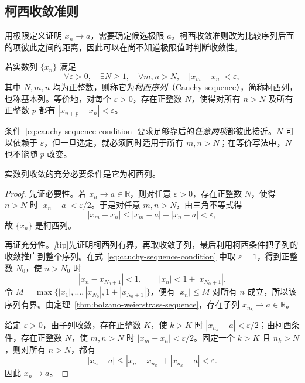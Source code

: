 \documentclass[UTF8,12pt,a4paper,fontset=fandol]{ctexbook}
\begin{document}
\subsection{柯西收敛准则}
\label{subsec:cauchy-convergence-criterion}

用极限定义证明 $x_n\to a$，需要确定候选极限 $a$。柯西收敛准则改为比较序列后面的项彼此之间的距离，因此可以在尚不知道极限值时判断收敛性。

\begin{definition}
\label{def:cauchy-sequence}
若实数列 $\{x_n\}$ 满足
\begin{equation}
    \forall\varepsilon>0,\quad\exists N\geq1,\quad
    \forall m,n>N,\quad |x_m-x_n|<\varepsilon,
    \label{eq:cauchy-sequence-condition}
\end{equation}
其中 $N,m,n$ 均为正整数，则称它为\emph{柯西序列}（Cauchy sequence），简称柯西列，也称基本列。等价地，对每个 $\varepsilon>0$，存在正整数 $N$，使得对所有 $n>N$ 及所有正整数 $p$ 都有 $|x_{n+p}-x_n|<\varepsilon$。
\end{definition}

条件~\eqref{eq:cauchy-sequence-condition} 要求足够靠后的\emph{任意两项}都彼此接近。$N$ 可以依赖于 $\varepsilon$，但一旦选定，就必须同时适用于所有 $m,n>N$；在等价写法中，$N$ 也不能随 $p$ 改变。

\begin{theorem}[柯西收敛准则]
\label{thm:cauchy-convergence-criterion}
实数列收敛的充分必要条件是它为柯西列。
\end{theorem}

\begin{proof}
先证必要性。若 $x_n\to a\in\mathbb{R}$，则对任意 $\varepsilon>0$，存在正整数 $N$，使得 $n>N$ 时 $|x_n-a|<\varepsilon/2$。于是对任意 $m,n>N$，由三角不等式得
\[
    |x_m-x_n|\leq|x_m-a|+|x_n-a|<\varepsilon,
\]
故 $\{x_n\}$ 是柯西列。

再证充分性。\emph[tip]{先证明柯西列有界，再取收敛子列，最后利用柯西条件把子列的收敛推广到整个序列。}在式~\eqref{eq:cauchy-sequence-condition} 中取 $\varepsilon=1$，得到正整数 $N_0$，使 $n>N_0$ 时
\[
    |x_n-x_{N_0+1}|<1,
    \qquad |x_n|<1+|x_{N_0+1}|.
\]
令 $M=\max\{|x_1|,\ldots,|x_{N_0}|,1+|x_{N_0+1}|\}$，便有 $|x_n|\leq M$ 对所有 $n$ 成立，所以该序列有界。由定理~\ref{thm:bolzano-weierstrass-sequence}，存在子列 $x_{n_k}\to a\in\mathbb{R}$。

给定 $\varepsilon>0$，由子列收敛，存在正整数 $K$，使 $k>K$ 时 $|x_{n_k}-a|<\varepsilon/2$；由柯西条件，存在正整数 $N$，使 $m,n>N$ 时 $|x_m-x_n|<\varepsilon/2$。固定一个 $k>K$ 且 $n_k>N$，则对所有 $n>N$，都有
\[
    |x_n-a|\leq|x_n-x_{n_k}|+|x_{n_k}-a|<\varepsilon.
\]
因此 $x_n\to a$。
\end{proof}
\end{document}
